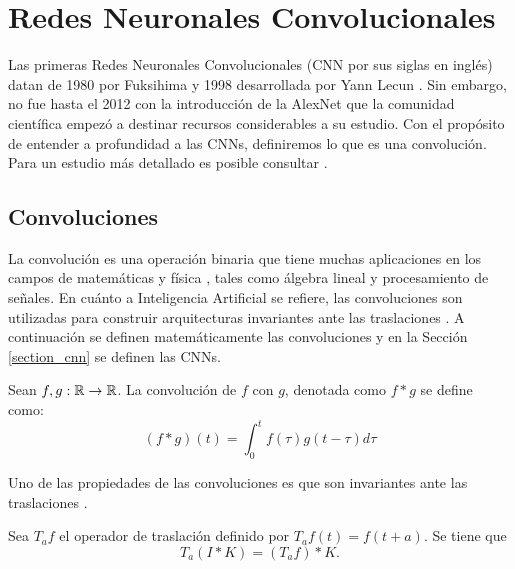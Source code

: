 \chapter{Redes Neuronales Convolucionales}


Las primeras Redes Neuronales Convolucionales (CNN por sus siglas en inglés) datan de 1980  por Fuksihima \cite{firstCnn} y 1998 desarrollada por Yann Lecun \cite{lecunCnn}. Sin embargo, no fue hasta el 2012 con la introducción de la AlexNet \cite{alexnet} que la comunidad científica empezó a destinar recursos considerables a su estudio. Con el propósito de entender a profundidad a las CNNs, definiremos lo que es una convolución. Para un estudio más detallado es posible consultar \cite{CNNdefinition,deeplearningbook}. 

\section{Convoluciones}
La convolución es una operación binaria que tiene muchas aplicaciones en los campos de matemáticas y física \cite{convolution_for_quaternion}, tales como álgebra lineal y procesamiento de señales. En cuánto a Inteligencia Artificial se refiere, las convoluciones son utilizadas para construir arquitecturas invariantes ante las traslaciones \cite{convolution_invariance}. A continuación se definen matemáticamente las convoluciones y en la Sección \ref{section_cnn} se definen las CNNs.
 \begin{definition}[Convolución]
    \label{convolution_definition}
     Sean $f,g : \mathbb R \to \mathbb R$. La convolución de $f$ con $g$, denotada como $f * g$ se define como:
     $$(f*g)(t) = \int_{0}^t f(\tau)g(t-\tau)d\tau$$
 \end{definition}

 Uno de las propiedades de las convoluciones es que son invariantes ante las traslaciones \cite{convolution_invariance}.
\begin{proposition}
    Sea $T_af$ el operador de traslación definido por $T_af(t) = f(t+a)$. Se tiene que 
    \begin{equation}
        T_a(I*K) = (T_af)*K.
    \end{equation}
\end{proposition}

